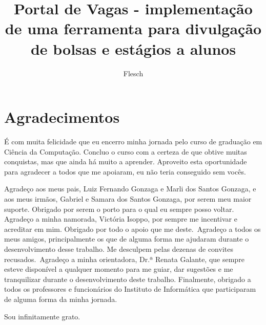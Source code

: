 \documentclass[cic,tc]{iiufrgs}
\title{Portal de Vagas - implementação de uma ferramenta para divulgação de bolsas e estágios a alunos}
\author{Flesch}{Jean Ampos}
\begin{document}
\maketitle


\chapter*{Agradecimentos}
É com muita felicidade que eu encerro minha jornada pelo curso de graduação em Ciência da Computação. Concluo o curso com a certeza de que obtive muitas conquistas, mas que ainda há muito a aprender. Aproveito esta oportunidade para agradecer a todos que me apoiaram, eu não teria conseguido sem vocês.

Agradeço aos meus pais, Luiz Fernando Gonzaga e Marli dos Santos Gonzaga, e aos meus irmãos, Gabriel e Samara dos Santos Gonzaga, por serem meu maior suporte. Obrigado por serem o porto para o qual eu sempre posso voltar. Agradeço a minha namorada, Victória Isoppo, por sempre me incentivar e acreditar em mim. Obrigado por todo o apoio que me deste.~Agradeço a todos os meus amigos, principalmente os que de alguma forma me ajudaram durante o desenvolvimento desse trabalho. Me desculpem pelas dezenas de convites recusados.~Agradeço a minha orientadora, Dr.ª Renata Galante, que sempre esteve disponível a qualquer momento para me guiar, dar sugestões e me tranquilizar durante o desenvolvimento deste trabalho. Finalmente, obrigado a todos os professores e funcionários do Instituto de Informática que participaram de alguma forma da minha jornada.

Sou infinitamente grato.
\end{document}
